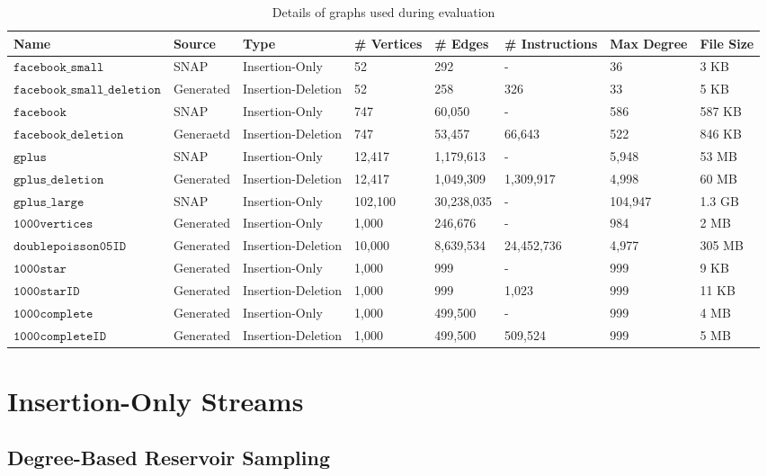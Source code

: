\documentclass[11pt,twoside,a4paper]{report}
\begin{document}
\begin{center}
	\begin{table}[h]
		\caption{Details of graphs used during evaluation}
		\tiny
		\begin{tabular}{|l|l|l|l|l|l|l|l|}
			\hline
			\textbf{Name}&\textbf{Source}&\textbf{Type}&\textbf{\# Vertices}&\textbf{\# Edges}&\textbf{\# Instructions}&\textbf{Max Degree}&\textbf{File Size}\\
			\hline
			$\mathtt{facebook\_small}$&SNAP&Insertion-Only&52&292&-&36&3 KB\\
			$\mathtt{facebook\_small\_deletion}$&Generated&Insertion-Deletion&52&258&326&33&5 KB\\
			$\mathtt{facebook}$&SNAP&Insertion-Only&747&60,050&-&586&587 KB\\
			$\mathtt{facebook\_deletion}$&Generaetd&Insertion-Deletion&747&53,457&66,643&522&846 KB\\
			$\mathtt{gplus}$&SNAP&Insertion-Only&12,417&1,179,613&-&5,948&53 MB\\
			$\mathtt{gplus\_deletion}$&Generated&Insertion-Deletion&12,417&1,049,309&1,309,917&4,998&60 MB\\
			$\mathtt{gplus\_large}$&SNAP&Insertion-Only&102,100&30,238,035&-&104,947&1.3 GB\\
			$\mathtt{1000vertices}$&Generated&Insertion-Only&1,000&246,676&-&984&2 MB\\
			$\mathtt{doublepoisson05ID}$&Generated&Insertion-Deletion&10,000&8,639,534&24,452,736&4,977&305 MB\\
			$\mathtt{1000star}$&Generated&Insertion-Only&1,000&999&-&999&9 KB\\
			$\mathtt{1000starID}$&Generated&Insertion-Deletion&1,000&999&1,023&999&11 KB\\
			$\mathtt{1000complete}$&Generated&Insertion-Only&1,000&499,500&-&999&4 MB\\
			$\mathtt{1000completeID}$&Generated&Insertion-Deletion&1,000&499,500&509,524&999&5 MB\\
			\hline
		\end{tabular}
	\end{table}
\end{center}

\chapter{Insertion-Only Streams}

\section{Degree-Based Reservoir Sampling}
\end{document}
